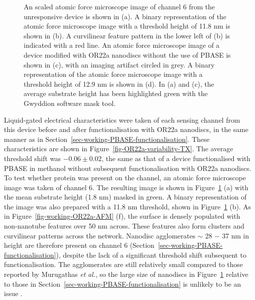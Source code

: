 \documentclass[
  a4paper,
]{scrbook}
\begin{document}
\begin{figure}
\begin{minipage}[t]{0.01\linewidth}
{}

\end{minipage}%

\caption{\label{fig-OR22a-variability-AFM-comparison}An scaled atomic
force microscope image of channel 6 from the unresponsive device is
shown in (a). A binary representation of the atomic force microscope
image with a threshold height of 11.8 nm is shown in (b). A curvilinear
feature pattern in the lower left of (b) is indicated with a red line.
An atomic force microscope image of a device modified with OR22a
nanodiscs without the use of PBASE is shown in (c), with an imaging
artifact circled in grey. A binary representation of the atomic force
microscope image with a threshold height of 12.9 nm is shown in (d). In
(a) and (c), the average substrate height has been highlighted green
with the Gwyddion software mask tool.}

\end{figure}

Liquid-gated electrical characteristics were taken of each sensing
channel from this device before and after functionalisation with OR22a
nanodiscs, in the same manner as in
Section~\ref{sec-working-PBASE-functionalisation}. These characteristics
are shown in Figure~\ref{fig-OR22a-variability-TX}. The average
threshold shift was \(-0.06\pm0.02\), the same as that of a device
functionalised with PBASE in methanol without subsequent
functionalisation with OR22a nanodiscs. To test whether protein was
present on the channel, an atomic force microscope image was taken of
channel 6. The resulting image is shown in
Figure~\ref{fig-OR22a-variability-AFM-comparison} (a) with the mean
substrate height (1.8 nm) masked in green. A binary representation of
the image was also prepared with a 11.8 nm threshold, shown in
Figure~\ref{fig-OR22a-variability-AFM-comparison} (b). As in
Figure~\ref{fig-working-OR22a-AFM} (f), the surface is densely populated
with non-nanotube features over 50 nm across. These features also form
clusters and curvilinear patterns across the network. Nanodisc
agglomerates \(\sim\) 28 \(-\) 37 nm in height are therefore present on
channel 6 (Section~\ref{sec-working-PBASE-functionalisation}), despite
the lack of a significant threshold shift subsequent to
functionalisation. The agglomerates are still relatively small compared
to those reported by Murugathas \emph{et al.}, so the large size of
nanodiscs in Figure~\ref{fig-OR22a-variability-AFM-comparison} relative
to those in Section~\ref{sec-working-PBASE-functionalisation} is
unlikely to be an issue \autocite{Murugathas2019a}.
\end{document}

